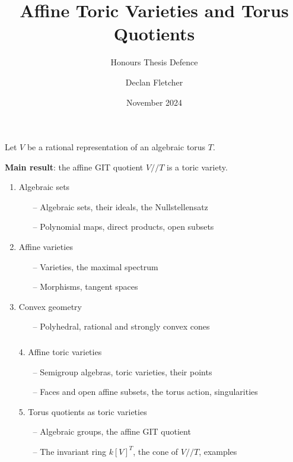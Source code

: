 \documentclass[handout]{beamer}
\title{Affine Toric Varieties and Torus Quotients}
\subtitle{Honours Thesis Defence}
\author{Declan Fletcher}
\date{November 2024}
\theoremstyle{definition}
\begin{document}
\frame{\titlepage}

\begin{frame}
\frametitle{}
Let $V$ be a rational representation of an algebraic torus $T$.

\textbf{Main result}: the affine GIT quotient $V /\!\!/ T$ is a toric variety.

\begin{enumerate}
\pause
\item Algebraic sets
\begin{enumerate}
\item[--] Algebraic sets, their ideals, the Nullstellensatz
\item[--] Polynomial maps, direct products, open subsets
\end{enumerate}
\pause
\item Affine varieties
\begin{enumerate}
\item[--] Varieties, the maximal spectrum
\item[--] Morphisms, tangent spaces
\end{enumerate}
\pause
\item Convex geometry
\begin{enumerate}
\item[--] Polyhedral, rational and strongly convex cones
\end{enumerate}
\end{enumerate}
\end{frame}

\begin{frame}
\frametitle{}
\begin{enumerate}
\item[4.] Affine toric varieties
\begin{enumerate}
\item[--] Semigroup algebras, toric varieties, their points
\item[--] Faces and open affine subsets, the torus action, singularities
\end{enumerate}
\pause
\item[5.] Torus quotients as toric varieties
\begin{enumerate}
\item[--] Algebraic groups, the affine GIT quotient
\item[--] The invariant ring $k[V]^T$, the cone of $V / \!\! / T$, examples
\end{enumerate}
\end{enumerate}
\end{frame}
\end{document}
